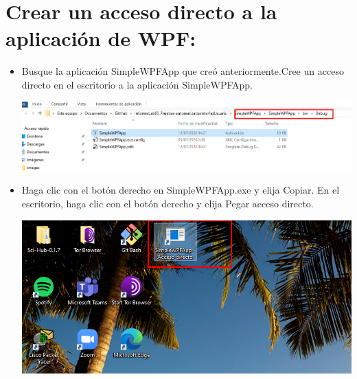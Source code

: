 \section{Crear un acceso directo a la aplicación de WPF:} 

\begin{itemize}
\item Busque la aplicación SimpleWPFApp que creó anteriormente.Cree un acceso directo en el escritorio a la aplicación SimpleWPFApp.
\begin{center}
\includegraphics[width=\columnwidth]{images/4}\newline
\end{center} \item Haga clic con el botón derecho en SimpleWPFApp.exe y elija Copiar. En el escritorio, haga clic con el botón derecho y elija Pegar acceso directo.
\begin{center}
\includegraphics[width=\columnwidth]{images/5}\newline
\end{center}
\end{itemize}
